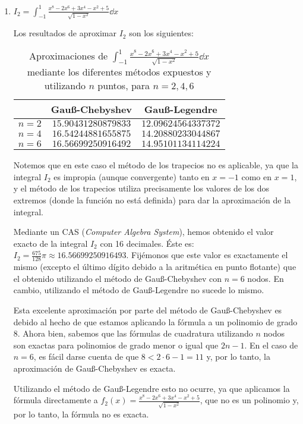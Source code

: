 \documentclass[a4paper]{article}
\begin{document}
\begin{enumerate}
    \item $\displaystyle I_2=\int_{-1}^1\frac{x^8-2x^6+3x^4-x^2+5}{\sqrt{1-x^2}}\dd x$\par
    Los resultados de aproximar $I_2$ son los siguientes:
    \begin{table}[ht]
        \centering
        \captionsetup{width=0.9\textwidth}
        \begin{tabular}{|c|c|c|}
            \cline{2-3}
            \multicolumn{1}{c|}{} & Gau\ss-Chebyshev & Gau\ss-Legendre \\
            \hline
            $n=2$ & $15.90431280879833$ & $12.09624564337372$ \\
            \hline
            $n=4$ & $16.54244881655875$ & $14.20880233044867$ \\
            \hline
            $n=6$ & $16.56699250916492$ & $14.95101134114224$ \\
            \hline
        \end{tabular}
        \caption{Aproximaciones de $\displaystyle\int_{-1}^1\frac{x^8-2x^6+3x^4-x^2+5}{\sqrt{1-x^2}}\dd x$ mediante los diferentes métodos expuestos y utilizando $n$ puntos, para $n=2,4,6$}
    \end{table}\par
    Notemos que en este caso el método de los trapecios no es aplicable, ya que la integral $I_2$ es impropia (aunque convergente) tanto en $x=-1$ como en $x=1$, y el método de los trapecios utiliza precisamente los valores de los dos extremos (donde la función no está definida) para dar la aproximación de la integral.\par
    Mediante un CAS (\textit{Computer Algebra System}), hemos obtenido el valor exacto de la integral $I_2$ con 16 decimales. Éste es: $I_2=\frac{675}{128}\pi\approx 16.56699250916493$. Fijémonos que este valor es exactamente el mismo (excepto el último dígito debido a la aritmética en punto flotante) que el obtenido utilizando el método de Gau\ss-Chebyshev con $n=6$ nodos. En cambio, utilizando el método de Gau\ss-Legendre no sucede lo mismo.\par
    Esta excelente aproximación por parte del método de Gau\ss-Chebyshev es debido al hecho de que estamos aplicando la fórmula a un polinomio de grado 8. Ahora bien, sabemos que las fórmulas de cuadratura utilizando $n$ nodos son exactas para polinomios de grado menor o igual que $2n-1$. En el caso de $n=6$, es fácil darse cuenta de que $8<2\cdot 6-1=11$ y, por lo tanto, la aproximación de Gau\ss-Chebyshev es exacta.\par Utilizando el método de Gau\ss-Legendre esto no ocurre, ya que aplicamos la fórmula directamente a $f_2(x)=\frac{x^8-2x^6+3x^4-x^2+5}{\sqrt{1-x^2}}$, que no es un polinomio y, por lo tanto, la fórmula no es exacta.

\end{enumerate}
\end{document}
